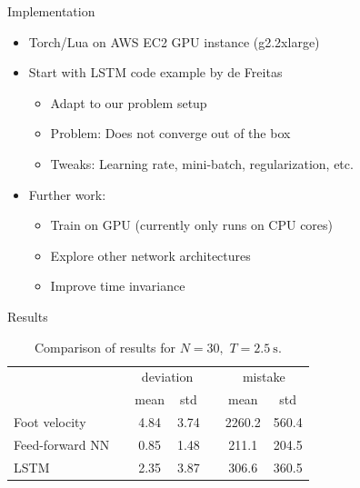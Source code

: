 \documentclass{beamer}
\newcommand{\ra}[1]{\renewcommand{\arraystretch}{#1}}
\begin{document}
\begin{frame}{Implementation}
    \begin{itemize}
        \item Torch/Lua on AWS EC2 GPU instance (g2.2xlarge)
        \item Start with LSTM code example by de Freitas
        \begin{itemize}
            \item Adapt to our problem setup
            \item Problem: Does not converge out of the box
            \item Tweaks: Learning rate, mini-batch, regularization, etc.
        \end{itemize}
        \item Further work:
        \begin{itemize}
            \item Train on GPU (currently only runs on CPU cores)
            \item Explore other network architectures
            \item Improve time invariance
        \end{itemize}
    \end{itemize}
\end{frame}

\begin{frame}{Results}
    \begin{table}[H]
        \begin{center}
        \ra{1.2}
        \begin{tabular}{@{} l c cc c cc @{}}
        \toprule
        && \multicolumn{2}{c}{deviation} && \multicolumn{2}{c}{mistake} \\
        \cmidrule{3-4} \cmidrule{6-7}
        {} && mean & std && mean & std \\
        \midrule
        Foot velocity   &&   4.84 & 3.74	&& 2260.2 &  560.4 \\
        Feed-forward NN &&   0.85 & 1.48	&&  211.1 &  204.5 \\
        LSTM            &&   2.35 & 3.87	&&  306.6 &  360.5 \\
        \bottomrule
        \end{tabular}
        \caption
        {
            Comparison of results for
            \(
                N
                =
                30
                ,
            \)
            \(
                T
                =
                \SI
                {
                    2.5
                }
                {
                    \second
                }
                .
            \)
        }
        \end{center}
    \end{table}
\end{frame}
\end{document}
